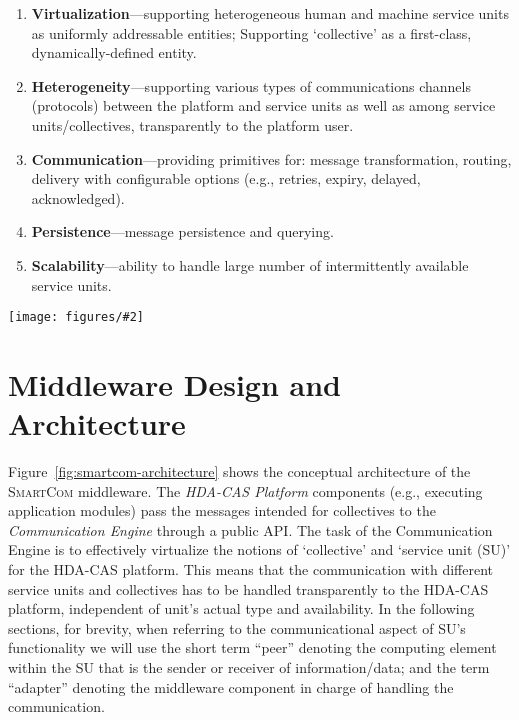 \documentclass{llncs}
\newcommand{\mdl}{\textsc{SmartCom}}
\newcommand{\figfull}[3][0.9]{
\begin{figure*}[t]
\centering
\texttt{[image: figures/\#2]}
\caption{#3}
\label{fig:#2}
\end{figure*}
}
\begin{document}
      \begin{enumerate}
        \item \textbf{Virtualization}---supporting heterogeneous human and machine service units as uniformly addressable entities; Supporting `collective' as a first-class, dynamically-defined entity.
        \item \textbf{Heterogeneity}---supporting various types of communications channels (protocols) between the platform and service units as well as among service units/collectives, transparently to the platform user.
        \item \textbf{Communication}---providing primitives for: message transformation, routing, delivery with configurable options (e.g., retries, expiry, delayed, acknowledged).
        \item \textbf{Persistence}---message persistence and querying.
        \item \textbf{Scalability}---ability to handle large number of intermittently available service units.
      \end{enumerate}
      

\figfull[0.85]{smartcom-architecture}{Simplified architecture of the \mdl{} middleware.}

\section{Middleware Design and Architecture}
\label{sec:middleware}


  Figure~\ref{fig:smartcom-architecture} shows the conceptual architecture of the \mdl{} middleware. The \emph{HDA-CAS Platform} components (e.g., executing application modules) pass the messages intended for collectives to the \emph{Communication Engine} through a public API. The task of the Communication Engine is to effectively virtualize the notions of `collective' and `service unit (SU)' for the HDA-CAS platform. This means that the communication with different service units and collectives has to be handled transparently to the HDA-CAS platform, independent of unit's actual type and availability. 
  In the following sections, for brevity, when referring to the communicational aspect of SU's functionality we will use the short term ``peer'' denoting the computing element within the SU that is the sender or receiver of information/data; and the term ``adapter'' denoting the middleware component in charge of handling the communication.
\end{document}
